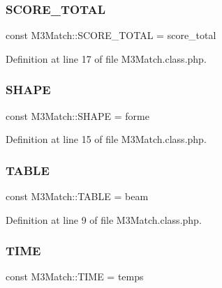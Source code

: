 \subsubsection{\texorpdfstring{S\+C\+O\+R\+E\+\_\+\+T\+O\+T\+AL}{SCORE\_TOTAL}}
{\footnotesize\ttfamily const M3\+Match\+::\+S\+C\+O\+R\+E\+\_\+\+T\+O\+T\+AL = \textquotesingle{}score\+\_\+total\textquotesingle{}}



Definition at line 17 of file M3\+Match.\+class.\+php.

\mbox{\label{class_m3_match_a52d9be1a9435d1be7d707f4ee1b8d663}} 
\subsubsection{\texorpdfstring{S\+H\+A\+PE}{SHAPE}}
{\footnotesize\ttfamily const M3\+Match\+::\+S\+H\+A\+PE = \textquotesingle{}forme\textquotesingle{}}



Definition at line 15 of file M3\+Match.\+class.\+php.

\mbox{\label{class_m3_match_a6eaee15de69f066350ecf628365c8def}} 
\subsubsection{\texorpdfstring{T\+A\+B\+LE}{TABLE}}
{\footnotesize\ttfamily const M3\+Match\+::\+T\+A\+B\+LE = \textquotesingle{}beam\textquotesingle{}}



Definition at line 9 of file M3\+Match.\+class.\+php.

\mbox{\label{class_m3_match_a3b55c9f7f046069d30af06f121825f6c}} 
\subsubsection{\texorpdfstring{T\+I\+ME}{TIME}}
{\footnotesize\ttfamily const M3\+Match\+::\+T\+I\+ME = \textquotesingle{}temps\textquotesingle{}}



